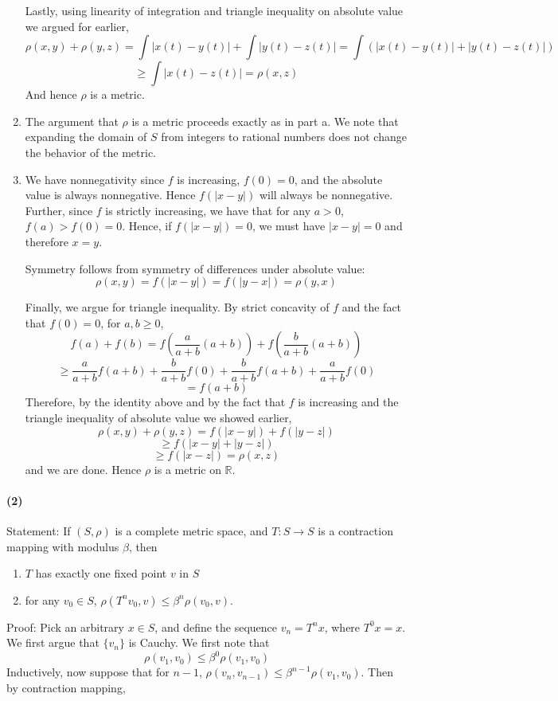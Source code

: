 \documentclass[10pt,letter]{article}
\newcommand{\problempart}[1]{\paragraph{#1}}
\begin{document}
\begin{enumerate}[label=(\alph*)]
Lastly, using linearity of integration and triangle inequality on absolute value we argued for earlier,
\[ \rho(x,y) + \rho(y,z) = \int |x(t) - y(t)| + \int |y(t) - z(t)| = \int \left(|x(t) - y(t)| + |y(t) - z(t)| \right)  \]
\[ \ge \int |x(t) - z(t)| = \rho(x,z) \]
And hence $\rho$ is a metric.

\item The argument that $\rho$ is a metric proceeds exactly as in part a. We note that expanding the domain of $S$ from integers to rational numbers does not change the behavior of the metric.

\item We have nonnegativity since $f$ is increasing, $f(0) = 0$, and the absolute value is always nonnegative. Hence $f(|x-y|)$ will always be nonnegative. Further, since $f$ is strictly increasing, we have that for any $a > 0$, $f(a) > f(0) = 0$. Hence, if $f(|x-y|) = 0$, we must have $|x-y| = 0$ and therefore $x = y$.

Symmetry follows from symmetry of differences under absolute value:
\[ \rho(x,y) = f(|x-y|) = f(|y-x|) = \rho(y,x) \]

Finally, we argue for triangle inequality. By strict concavity of $f$ and the fact that $f(0)=0$, for $a, b \ge 0$,
\[  f(a) + f(b) = f\left( \frac{a}{a+b}(a+b) \right) +f\left(\frac{b}{a+b}(a+b) \right)  \]
\[ \ge \frac{a}{a+b}f(a+b) + \frac{b}{a+b}f(0) + \frac{b}{a+b}f(a+b) + \frac{a}{a+b}f(0)  \]
\[ = f(a+b) \]
Therefore, by the identity above and by the fact that $f$ is increasing and the triangle inequality of absolute value we showed earlier,
\[ \rho(x,y) + \rho(y,z) = f(|x-y|) + f(|y-z|) \]
\[ \ge f(|x-y| + |y-z|) \]
\[ \ge f(|x-z|) = \rho(x,z) \]
and we are done. Hence $\rho$ is a metric on $\mathbb{R}$.
\end{enumerate}
\problempart{(2)}
Statement: If $(S, \rho)$ is a complete metric space, and $T:S \to S$ is a contraction mapping with modulus $\beta$, then
\begin{enumerate}[label=(\alph*)]
\item $T$ has exactly one fixed point $v$ in $S$
\item for any $v_0 \in S$, $\rho (T^n v_0, v) \le \beta^n \rho(v_0, v)$.
\end{enumerate}
Proof: Pick an arbitrary $x \in S$, and define the sequence $v_n = T^n x$, where $T^0 x = x$. We first argue that $\{ v_n \}$ is Cauchy. We first note that
\[ \rho(v_1, v_0) \le \beta^0 \rho(v_1, v_0) \]
Inductively, now suppose that for $n-1$, $\rho(v_{n}, v_{n-1}) \le \beta^{n-1} \rho(v_1, v_0)$. Then by contraction mapping,
\end{document}
